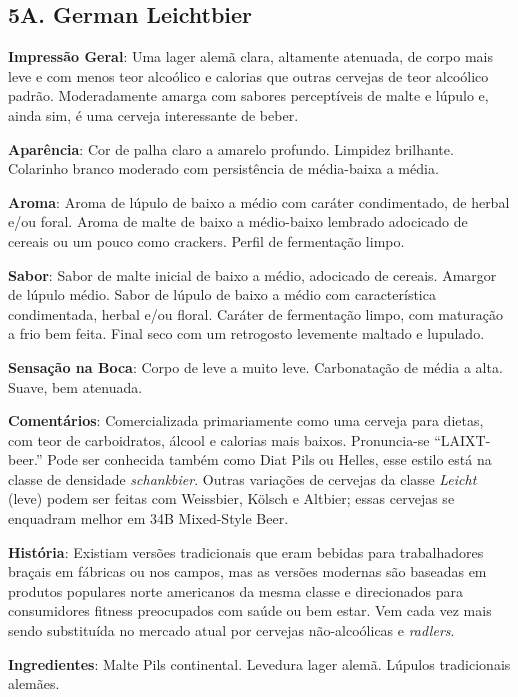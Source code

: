 \subsection*{5A. German Leichtbier}
\textbf{Impressão Geral}: Uma lager alemã clara, altamente atenuada, de corpo mais leve e com menos teor alcoólico e calorias que outras cervejas de teor alcoólico padrão. Moderadamente amarga com sabores perceptíveis de malte e lúpulo e, ainda sim, é uma cerveja interessante de beber.

\textbf{Aparência}: Cor de palha claro a amarelo profundo. Limpidez brilhante. Colarinho branco moderado com persistência de média-baixa a média.

\textbf{Aroma}: Aroma de lúpulo de baixo a médio com caráter condimentado, de herbal e/ou foral. Aroma de malte de baixo a médio-baixo lembrado adocicado de cereais ou um pouco como crackers. Perfil de fermentação limpo.

\textbf{Sabor}: Sabor de malte inicial de baixo a médio, adocicado de cereais. Amargor de lúpulo médio. Sabor de lúpulo de baixo a médio com característica condimentada, herbal e/ou floral. Caráter de fermentação limpo, com maturação a frio bem feita. Final seco com um retrogosto levemente maltado e lupulado.

\textbf{Sensação na Boca}: Corpo de leve a muito leve. Carbonatação de média a alta. Suave, bem atenuada.

\textbf{Comentários}: Comercializada primariamente como uma cerveja para dietas, com teor de carboidratos, álcool e calorias mais baixos. Pronuncia-se “LAIXT-beer.” Pode ser conhecida também como Diat Pils ou Helles, esse estilo está na classe de densidade \textit{schankbier}. Outras variações de cervejas da classe \textit{Leicht} (leve) podem ser feitas com Weissbier, Kölsch e Altbier; essas cervejas se enquadram melhor em 34B Mixed-Style Beer.

\textbf{História}: Existiam versões tradicionais que eram bebidas para trabalhadores braçais em fábricas ou nos campos, mas as versões modernas são baseadas em produtos populares norte americanos da mesma classe e direcionados para consumidores fitness preocupados com saúde ou bem estar. Vem cada vez mais sendo substituída no mercado atual por cervejas não-alcoólicas e \textit{radlers}.

\textbf{Ingredientes}: Malte Pils continental. Levedura lager alemã. Lúpulos tradicionais alemães.

